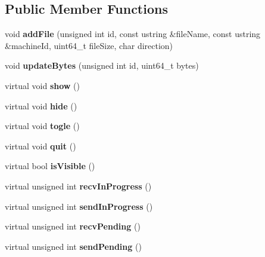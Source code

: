 \subsection*{\-Public \-Member \-Functions}
\begin{DoxyCompactItemize}
\item 
\hypertarget{classinstSendWidget_a7be756f8e07f0d9185cd708ada1e5986}{void {\bfseries add\-File} (unsigned int id, const ustring \&file\-Name, const ustring \&machine\-Id, uint64\-\_\-t file\-Size, char direction)}\label{classinstSendWidget_a7be756f8e07f0d9185cd708ada1e5986}

\item 
\hypertarget{classinstSendWidget_ac02750ff02e273e63863d4e0b2b8ac44}{void {\bfseries update\-Bytes} (unsigned int id, uint64\-\_\-t bytes)}\label{classinstSendWidget_ac02750ff02e273e63863d4e0b2b8ac44}

\item 
\hypertarget{classinstSendWidget_a33c6d042b9eeb1451e045be080143a63}{virtual void {\bfseries show} ()}\label{classinstSendWidget_a33c6d042b9eeb1451e045be080143a63}

\item 
\hypertarget{classinstSendWidget_adaf00468c149683c46a37f70397346ef}{virtual void {\bfseries hide} ()}\label{classinstSendWidget_adaf00468c149683c46a37f70397346ef}

\item 
\hypertarget{classinstSendWidget_abf06ab13d6da76955b8b1cd63f7f2630}{virtual void {\bfseries togle} ()}\label{classinstSendWidget_abf06ab13d6da76955b8b1cd63f7f2630}

\item 
\hypertarget{classinstSendWidget_ad2efffdb4e6949285b36315d92a57092}{virtual void {\bfseries quit} ()}\label{classinstSendWidget_ad2efffdb4e6949285b36315d92a57092}

\item 
\hypertarget{classinstSendWidget_a71c6fe0a67b57e65d5a348a3c348100c}{virtual bool {\bfseries is\-Visible} ()}\label{classinstSendWidget_a71c6fe0a67b57e65d5a348a3c348100c}

\item 
\hypertarget{classinstSendWidget_ab93807e8365c07c466d1e537e2a27460}{virtual unsigned int {\bfseries recv\-In\-Progress} ()}\label{classinstSendWidget_ab93807e8365c07c466d1e537e2a27460}

\item 
\hypertarget{classinstSendWidget_a5f92aec68e5910b95ec8fa422f856f81}{virtual unsigned int {\bfseries send\-In\-Progress} ()}\label{classinstSendWidget_a5f92aec68e5910b95ec8fa422f856f81}

\item 
\hypertarget{classinstSendWidget_a33c1ccdd9166434d2b1b7816d86f445c}{virtual unsigned int {\bfseries recv\-Pending} ()}\label{classinstSendWidget_a33c1ccdd9166434d2b1b7816d86f445c}

\item 
\hypertarget{classinstSendWidget_a5d9c9ed5ed5bad74c7bf2e3cdb9eee18}{virtual unsigned int {\bfseries send\-Pending} ()}\label{classinstSendWidget_a5d9c9ed5ed5bad74c7bf2e3cdb9eee18}

\end{DoxyCompactItemize}
